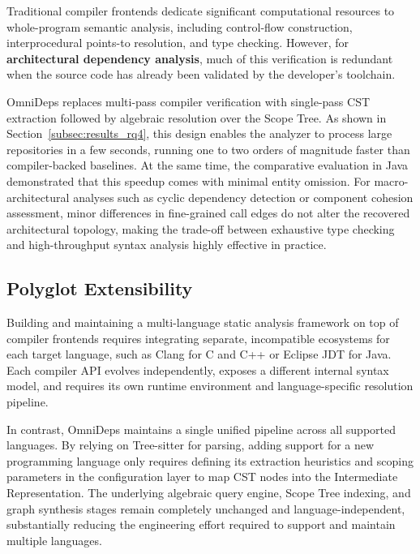 Traditional compiler frontends dedicate significant computational resources to
whole-program semantic analysis, including control-flow construction,
interprocedural points-to resolution, and type checking. However, for
\textbf{architectural dependency analysis}, much of this verification is
redundant when the source code has already been validated by the developer's
toolchain.

OmniDeps replaces multi-pass compiler verification with single-pass CST
extraction followed by algebraic resolution over the Scope Tree. As shown in
Section~\ref{subsec:results_rq4}, this design enables the analyzer to process
large repositories in a few seconds, running one to two orders of magnitude
faster than compiler-backed baselines. At the same time, the comparative
evaluation in Java demonstrated that this speedup comes with minimal entity
omission. For macro-architectural analyses such as cyclic dependency detection
or component cohesion assessment, minor differences in fine-grained call edges
do not alter the recovered architectural topology, making the trade-off between
exhaustive type checking and high-throughput syntax analysis highly effective
in practice.

\subsection{Polyglot Extensibility}
\label{subsec:discussion_engineering_economy}

Building and maintaining a multi-language static analysis framework on top of
compiler frontends requires integrating separate, incompatible ecosystems for
each target language, such as Clang for C and C++ or Eclipse JDT for Java. Each
compiler API evolves independently, exposes a different internal syntax model,
and requires its own runtime environment and language-specific resolution
pipeline.

In contrast, OmniDeps maintains a single unified pipeline across all supported
languages. By relying on Tree-sitter for parsing, adding support for a new
programming language only requires defining its extraction heuristics and
scoping parameters in the configuration layer to map CST nodes into the
Intermediate Representation. The underlying algebraic query engine, Scope Tree
indexing, and graph synthesis stages remain completely unchanged and
language-independent, substantially reducing the engineering effort required to
support and maintain multiple languages.


